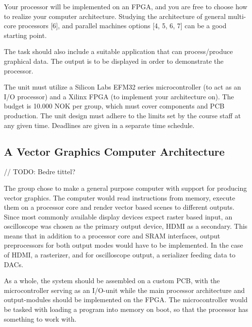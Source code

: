 Your processor will be implemented on an FPGA, and you are free to choose how to realize your computer architecture.
Studying the architecture of general multi-core processors [6], and parallel machines options [4, 5, 6, 7] can be a good starting point.


The task should also include a suitable application that can process/produce graphical data.
The output is to be displayed in order to demonstrate the processor.

The unit must utilize a Silicon Labs EFM32 series microcontroller (to act as an I/O processor) and a Xilinx FPGA (to implement your architecture on).
The budget is 10.000 NOK per group, which must cover components and PCB production.
The unit design must adhere to the limits set by the course staff at any given time.
Deadlines are given in a separate time schedule.

\subsection{A Vector Graphics Computer Architecture}

// TODO: Bedre tittel?

The group chose to make a general purpose computer with support for producing vector graphics.
The computer would read instructions from memory, execute them on a processor core and render vector based scenes to different outputs.
Since most commonly available display devices expect raster based input, an oscilloscope was chosen as the primary output device, HDMI as a secondary.
This means that in addition to a processor core and SRAM interfaces, output preprocessors for both output modes would have to be implemented.
In the case of HDMI, a rasterizer, and for oscilloscope output, a serializer feeding data to DACs.

As a whole, the system should be assembled on a custom PCB, with the microcontroller serving as an I/O-unit while the main processor architecture and output-modules should be implemented on the FPGA.
The microcontroller would be tasked with loading a program into memory on boot, so that the processor has something to work with.

